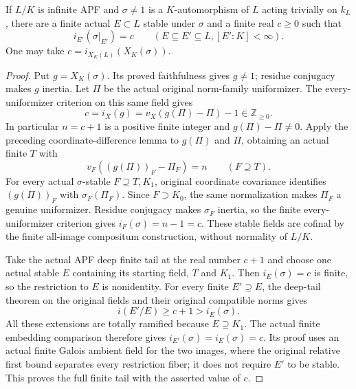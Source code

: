 \begin{lemma}
\label{fw:apf-embedding-order-stabilization}
\leanok
If $L/K$ is infinite APF and $\sigma\ne1$ is a $K$-automorphism of
$L$ acting trivially on $k_L$, there are a finite actual $E\subset L$
stable under $\sigma$ and a finite real $c\geq0$ such that
\[
 i_{E'}(\sigma|_{E'})=c\qquad(E\subseteq E'\subseteq L, [E':K]<\infty).
\]
One may take $c=i_{X_K(L)}(X_K(\sigma))$.
\end{lemma}
\begin{proof}
Put $g=X_K(\sigma)$. Its proved faithfulness gives $g\ne1$;
residue conjugacy makes $g$ inertia. Let $\Pi$ be the actual original
norm-family uniformizer. The every-uniformizer criterion on this
same field gives
\[
 c=i_X(g)=v_X(g(\Pi)-\Pi)-1\in\mathbb Z_{\geq0}.
\]
In particular $n=c+1$ is a positive finite integer and
$g(\Pi)-\Pi\ne0$. Apply the preceding coordinate-difference lemma
to $g(\Pi)$ and $\Pi$, obtaining an actual finite $T$ with
\[
 v_F((g(\Pi))_F-\Pi_F)=n\qquad(F\supseteq T).
\]
For every actual $\sigma$-stable $F\supseteq T,K_1$, original
coordinate covariance identifies $(g(\Pi))_F$ with
$\sigma_F(\Pi_F)$. Since $F\supset K_0$, the same normalization
makes $\Pi_F$ a genuine uniformizer. Residue conjugacy makes
$\sigma_F$ inertia, so the finite every-uniformizer criterion gives
$i_F(\sigma)=n-1=c$. These stable fields are cofinal by the finite
all-image compositum construction, without normality of $L/K$.

Take the actual APF deep finite tail at the real number $c+1$ and
choose one actual stable $E$ containing its starting field, $T$ and
$K_1$. Then $i_E(\sigma)=c$ is finite, so the restriction to $E$ is
nonidentity. For every finite $E'\supseteq E$, the deep-tail theorem
on the original fields and their original compatible norms gives
\[
 i(E'/E)\geq c+1>i_E(\sigma).
\]
All these extensions are totally ramified because $E\supseteq K_1$.
The actual finite embedding comparison therefore gives
$i_{E'}(\sigma)=i_E(\sigma)=c$. Its proof uses an actual finite
Galois ambient field for the two images, where the original relative
first bound separates every restriction fiber; it does not require
$E'$ to be stable. This proves the full finite tail with the asserted
value of $c$.
\end{proof}


